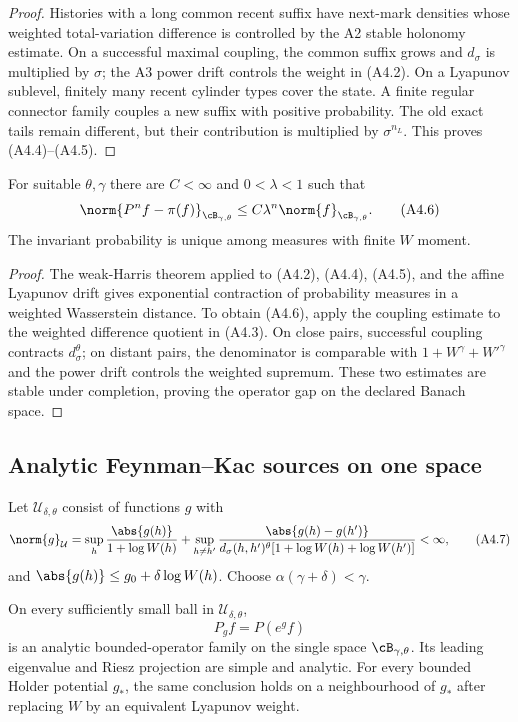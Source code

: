 \begin{proof}
Histories with a long common recent suffix have next-mark densities whose
weighted total-variation difference is controlled by the A2 stable
holonomy estimate.  On a successful maximal coupling, the common suffix grows
and $d_\sigma$ is multiplied by $\sigma$; the A3 power drift controls the
weight in (A4.2).  On a Lyapunov sublevel, finitely many recent cylinder types
cover the state.  A finite regular connector family couples a new suffix with
positive probability.  The old exact tails remain different, but their
contribution is multiplied by $\sigma^{n_L}$.  This proves (A4.4)--(A4.5).
\end{proof}

\begin{theorem}
\label{thm:r29-a4-harris}
For suitable $\theta,\gamma$ there are $C<\infty$ and $0<\lambda<1$ such
that
\[
 \norm{P^nf-\pi(f)}_{\cB_{\gamma,\theta}}
 \le C\lambda^n\norm{f}_{\cB_{\gamma,\theta}}.            \tag{A4.6}
\]
The invariant probability is unique among measures with finite $W$ moment.
\end{theorem}

\begin{proof}
The weak-Harris theorem applied to (A4.2), (A4.4), (A4.5), and the affine
Lyapunov drift gives exponential contraction of probability measures in a
weighted Wasserstein distance.  To obtain (A4.6), apply the coupling estimate
to the weighted difference quotient in (A4.3).  On close pairs, successful
coupling contracts $d_\sigma^\theta$; on distant pairs, the denominator is
comparable with $1+W^\gamma+W'^\gamma$ and the power drift controls the
weighted supremum.  These two estimates are stable under completion, proving
the operator gap on the declared Banach space.
\end{proof}

\subsection{Analytic Feynman--Kac sources on one space}

Let $\mathcal U_{\delta,\theta}$ consist of functions $g$ with
\[
 \norm{g}_{\mathcal U}=
 \sup_h{\abs{g(h)}\over1+\log W(h)}+
 \sup_{h\ne h'}{\abs{g(h)-g(h')}\over
 d_\sigma(h,h')^\theta[1+\log W(h)+\log W(h')]}<\infty,   \tag{A4.7}
\]
and $\abs{g(h)}\le g_0+\delta\log W(h)$.  Choose
$\alpha(\gamma+\delta)<\gamma$.

\begin{theorem}
\label{thm:r29-a4-fk}
On every sufficiently small ball in $\mathcal U_{\delta,\theta}$,
\[
 P_gf=P(e^gf)                                             \tag{A4.8}
\]
is an analytic bounded-operator family on the single space
$\cB_{\gamma,\theta}$.  Its leading eigenvalue and Riesz projection are simple
and analytic.  For every bounded Holder potential $g_*$, the same conclusion
holds on a neighbourhood of $g_*$ after replacing $W$ by an equivalent
Lyapunov weight.
\end{theorem}

